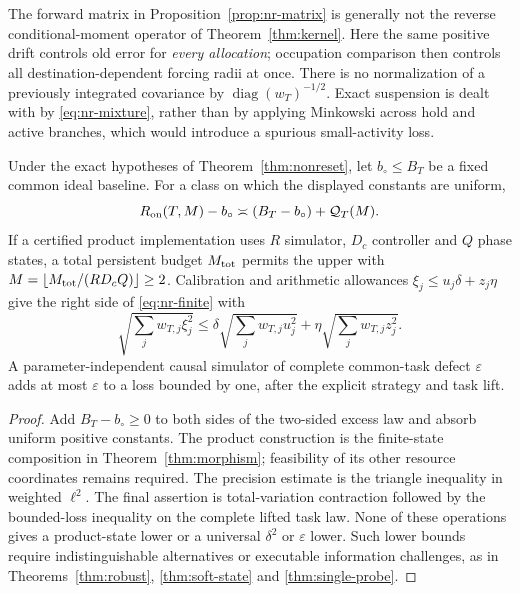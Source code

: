 The forward matrix in Proposition~\ref{prop:nr-matrix} is generally not the reverse conditional-moment operator of Theorem~\ref{thm:kernel}. Here the same positive drift controls old error for \emph{every allocation}; occupation comparison then controls all destination-dependent forcing radii at once. There is no normalization of a previously integrated covariance by $\operatorname{diag}(w_T)^{-1/2}$. Exact suspension is dealt with by \eqref{eq:nr-mixture}, rather than by applying Minkowski across hold and active branches, which would introduce a spurious small-activity loss.

\begin{corollary}\label{cor:nr-resources}
Under the exact hypotheses of Theorem~\ref{thm:nonreset}, let $b_\circ\le B_T$ be a fixed common ideal baseline. For a class on which the displayed constants are uniform,
\begin{equation}\label{eq:nr-common}
 R_{\mathrm{on}}(T,M)-b_\circ\asymp
             (B_T-b_\circ)+\mathcal Q_T(M).
\end{equation}
If a certified product implementation uses $R$ simulator, $D_c$ controller and $Q$ phase states, a total persistent budget $M_{\rm tot}$ permits the upper with $M=\lfloor M_{\rm tot}/(RD_cQ)\rfloor\ge2$. Calibration and arithmetic allowances $\xi_j\le u_j\delta+z_j\eta$ give the right side of \eqref{eq:nr-finite} with
\[
 \sqrt{\sum_jw_{T,j}\xi_j^2}
 \le\delta\sqrt{\sum_jw_{T,j}u_j^2}+\eta\sqrt{\sum_jw_{T,j}z_j^2}.
\]
A parameter-independent causal simulator of complete common-task defect $\varepsilon$ adds at most $\varepsilon$ to a loss bounded by one, after the explicit strategy and task lift.
\end{corollary}
\begin{proof}
Add $B_T-b_\circ\ge0$ to both sides of the two-sided excess law and absorb uniform positive constants. The product construction is the finite-state composition in Theorem~\ref{thm:morphism}; feasibility of its other resource coordinates remains required. The precision estimate is the triangle inequality in weighted $\ell^2$. The final assertion is total-variation contraction followed by the bounded-loss inequality on the complete lifted task law. None of these operations gives a product-state lower or a universal $\delta^2$ or $\varepsilon$ lower. Such lower bounds require indistinguishable alternatives or executable information challenges, as in Theorems~\ref{thm:robust}, \ref{thm:soft-state} and \ref{thm:single-probe}.
\end{proof}

